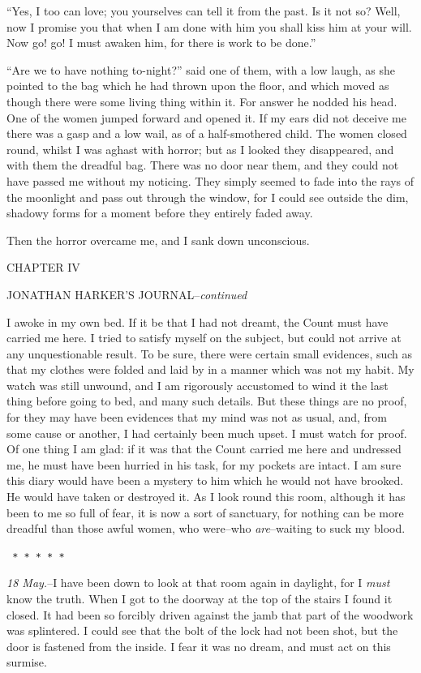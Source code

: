 \documentclass[12pt,openright]{book}
\begin{document}
“Yes, I too can love; you yourselves can tell it from the past. Is it not so? Well, now I promise you that when I am done with him you shall kiss him at your will. Now go! go! I must awaken him, for there is work to be done.”

“Are we to have nothing to-night?” said one of them, with a low laugh, as she pointed to the bag which he had thrown upon the floor, and which moved as though there were some living thing within it. For answer he nodded his head. One of the women jumped forward and opened it. If my ears did not deceive me there was a gasp and a low wail, as of a half-smothered child. The women closed round, whilst I was aghast with horror; but as I looked they disappeared, and with them the dreadful bag. There was no door near them, and they could not have passed me without my noticing. They simply seemed to fade into the rays of the moonlight and pass out through the window, for I could see outside the dim, shadowy forms for a moment before they entirely faded away.

Then the horror overcame me, and I sank down unconscious.

CHAPTER IV

JONATHAN HARKER’S JOURNAL–\textit{continued}

I awoke in my own bed. If it be that I had not dreamt, the Count must have carried me here. I tried to satisfy myself on the subject, but could not arrive at any unquestionable result. To be sure, there were certain small evidences, such as that my clothes were folded and laid by in a manner which was not my habit. My watch was still unwound, and I am rigorously accustomed to wind it the last thing before going to bed, and many such details. But these things are no proof, for they may have been evidences that my mind was not as usual, and, from some cause or another, I had certainly been much upset. I must watch for proof. Of one thing I am glad: if it was that the Count carried me here and undressed me, he must have been hurried in his task, for my pockets are intact. I am sure this diary would have been a mystery to him which he would not have brooked. He would have taken or destroyed it. As I look round this room, although it has been to me so full of fear, it is now a sort of sanctuary, for nothing can be more dreadful than those awful women, who were–who \textit{are}–waiting to suck my blood.

\texttt{   *       *       *       *       *}

\textit{18 May.}–I have been down to look at that room again in daylight, for I \textit{must} know the truth. When I got to the doorway at the top of the stairs I found it closed. It had been so forcibly driven against the jamb that part of the woodwork was splintered. I could see that the bolt of the lock had not been shot, but the door is fastened from the inside. I fear it was no dream, and must act on this surmise.
\end{document}
